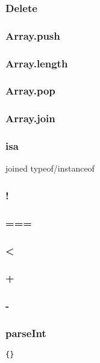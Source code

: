 \subsubsection{Delete}
\subsubsection{Array.push}
\subsubsection{Array.length}
\subsubsection{Array.pop}
\subsubsection{Array.join}
\subsubsection{isa}
joined typeof/instanceof
\subsubsection{!}
\subsubsection{===}
\subsubsection{<}
\subsubsection{+}
\subsubsection{-}
\subsubsection{parseInt}


\verb|{}|

